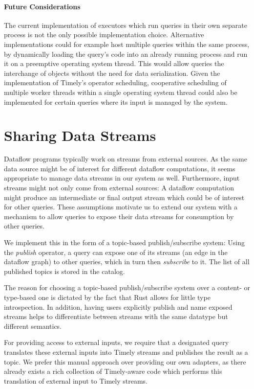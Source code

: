 \paragraph{Future Considerations}

The current implementation of executors which run queries in their own separate
process is not the only possible implementation choice.
Alternative implementations could for example host multiple queries
within the same process, by dynamically loading the query's code into an already
running process and run it on a preemptive operating system thread. This would allow queries
the interchange of objects without the need for data serialization. Given
the implementation of Timely's operator scheduling, cooperative scheduling
of multiple worker threads within a single operating system thread could also
be implemented for certain queries where its input is managed by the system.


\section{Sharing Data Streams} \label{sec:sharingstreams}

Dataflow programs typically work on streams from external sources. As the same
data source might be of interest for different dataflow computations, it seems
appropriate to manage data streams in our system as well. Furthermore,
input streams might not only come from external sources: A dataflow computation
might produce an intermediate or final output stream which could be of interest
for other queries. These assumptions motivate us to extend our system with a
mechanism to allow queries to expose their data streams for consumption by other
queries.

We implement this in the form of a topic-based publish/subscribe system:
Using the \emph{publish} operator, a query can expose one of its streams
(an edge in the dataflow graph) to other queries, which in turn then \emph{subscribe}
to it. The list of all published topics is stored in the catalog.

The reason for choosing a topic-based publish/subscribe system over a
content- or type-based one is dictated by the fact that Rust allows for little
type introspection. In addition, having users explicitly publish and name
exposed streams helps to differentiate between streams with the same datatype
but different semantics.

For providing access to external inputs, we require that a designated query
translates these external inputs into Timely streams and publishes the result as
a topic. We prefer this manual approach over providing our own adapters, as there
already exists a rich collection of Timely-aware code which performs this
translation of external input to Timely streams.

